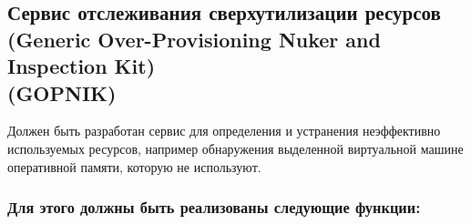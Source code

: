 \documentclass[14pt, a4paper]{extarticle}
\begin{document}
\subsection{Сервис отслеживания сверхутилизации ресурсов\\ (Generic Over-Provisioning Nuker and Inspection Kit)\\ (GOPNIK)}

Должен быть разработан сервис для определения и устранения неэффективно используемых ресурсов, например обнаружения выделенной виртуальной машине оперативной памяти, которую не используют.

\subsubsection*{Для этого должны быть реализованы следующие функции:}
\end{document}
